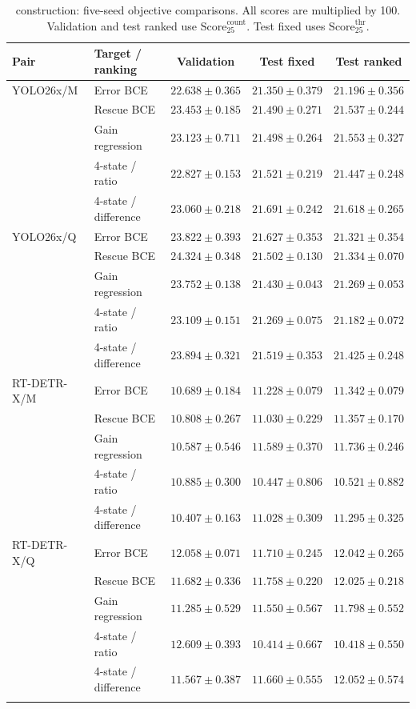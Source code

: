 \begin{table}[H]\centering
\caption{construction: five-seed objective comparisons. All scores are multiplied by 100. Validation and test ranked use $\mathrm{Score}_{25}^{\mathrm{count}}$. Test fixed uses $\mathrm{Score}_{25}^{\mathrm{thr}}$.}
\fontsize{7.5}{9}\selectfont
\setlength{\tabcolsep}{3pt}
\begin{tabular}{llccc}\toprule
Pair & Target / ranking & Validation & Test fixed & Test ranked \\\midrule
YOLO26x/M & Error BCE & $22.638\pm0.365$ & $21.350\pm0.379$ & $21.196\pm0.356$ \\
 & Rescue BCE & $23.453\pm0.185$ & $21.490\pm0.271$ & $21.537\pm0.244$ \\
 & Gain regression & $23.123\pm0.711$ & $21.498\pm0.264$ & $21.553\pm0.327$ \\
 & 4-state / ratio & $22.827\pm0.153$ & $21.521\pm0.219$ & $21.447\pm0.248$ \\
 & 4-state / difference & $23.060\pm0.218$ & $21.691\pm0.242$ & $21.618\pm0.265$ \\
\addlinespace
YOLO26x/Q & Error BCE & $23.822\pm0.393$ & $21.627\pm0.353$ & $21.321\pm0.354$ \\
 & Rescue BCE & $24.324\pm0.348$ & $21.502\pm0.130$ & $21.334\pm0.070$ \\
 & Gain regression & $23.752\pm0.138$ & $21.430\pm0.043$ & $21.269\pm0.053$ \\
 & 4-state / ratio & $23.109\pm0.151$ & $21.269\pm0.075$ & $21.182\pm0.072$ \\
 & 4-state / difference & $23.894\pm0.321$ & $21.519\pm0.353$ & $21.425\pm0.248$ \\
\addlinespace
RT-DETR-X/M & Error BCE & $10.689\pm0.184$ & $11.228\pm0.079$ & $11.342\pm0.079$ \\
 & Rescue BCE & $10.808\pm0.267$ & $11.030\pm0.229$ & $11.357\pm0.170$ \\
 & Gain regression & $10.587\pm0.546$ & $11.589\pm0.370$ & $11.736\pm0.246$ \\
 & 4-state / ratio & $10.885\pm0.300$ & $10.447\pm0.806$ & $10.521\pm0.882$ \\
 & 4-state / difference & $10.407\pm0.163$ & $11.028\pm0.309$ & $11.295\pm0.325$ \\
\addlinespace
RT-DETR-X/Q & Error BCE & $12.058\pm0.071$ & $11.710\pm0.245$ & $12.042\pm0.265$ \\
 & Rescue BCE & $11.682\pm0.336$ & $11.758\pm0.220$ & $12.025\pm0.218$ \\
 & Gain regression & $11.285\pm0.529$ & $11.550\pm0.567$ & $11.798\pm0.552$ \\
 & 4-state / ratio & $12.609\pm0.393$ & $10.414\pm0.667$ & $10.418\pm0.550$ \\
 & 4-state / difference & $11.567\pm0.387$ & $11.660\pm0.555$ & $12.052\pm0.574$ \\
\addlinespace
\bottomrule\end{tabular}\end{table}
